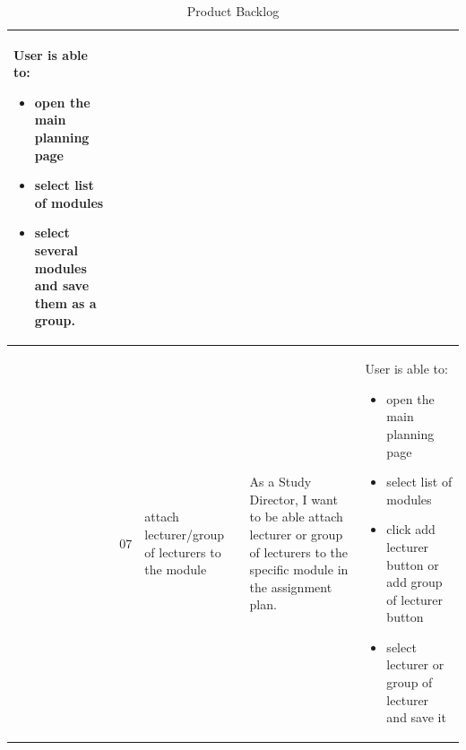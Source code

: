 \documentclass{scrartcl}
\begin{document}
\begin{table}[H]
\begin{center}
\begin{tabular}{|p{4cm}|p{0.5cm} |p{3cm}|p{4cm}|p{4cm}|}
   User is able to:            
\begin{itemize}
\item open the main planning page
\item select list of modules
\item select several modules and save them as a group.
\end{itemize}       \\ \hline

 &
 07&
 attach lecturer/group of lecturers to the module&
 As a Study Director, I want to be able attach lecturer or group of lecturers to the specific module in the assignment plan. &
 
   User is able to:            
\begin{itemize}
\item open the main planning page
\item select list of modules 
\item click add lecturer button or add group of lecturer button
\item select lecturer or group of lecturer and save it


\end{itemize}                                                             

  
\end{tabular}
\end{center}
\caption{Product Backlog}
\label{table2}
\end{table}

\pagebreak                                                            
\end{document}

